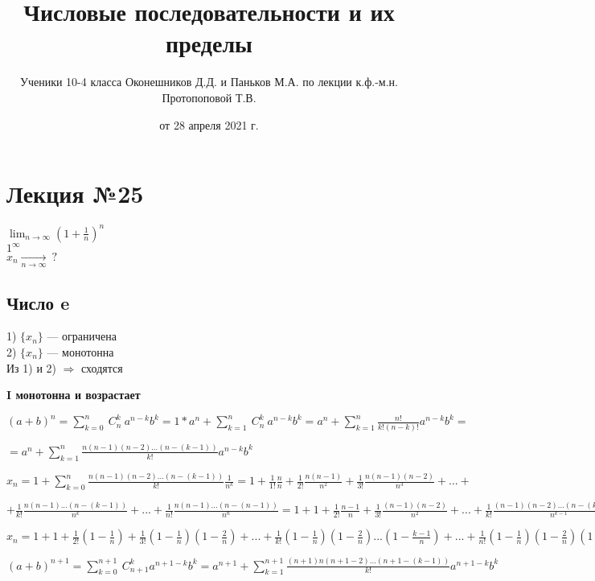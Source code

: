 \documentclass{article}
\begin{document}
\title{Числовые последовательности и их пределы}
\author{Ученики 10-4 класса Оконешников Д.Д. и Паньков М.А. по лекции к.ф.-м.н. Протопоповой Т.В.}
\date{от 28 апреля 2021 г.}
\maketitle

\section{Лекция №25}

\(\lim_{n \rightarrow \infty}{(1 + \frac{1}{n})^n}\)
\\ \(1^{\infty}\)
\\ \( x_n \xrightarrow[n \rightarrow \infty ]{}\ ? \)

\subsection{Число e}
1) \( \{ x_n \} \) --- ограничена \\
2) \( \{ x_n \} \) --- монотонна \\
Из 1) и 2) \( \Rightarrow \) сходятся

\textbf{I монотонна и возрастает}

\((a+b)^n = \sum_{k=0}^n\ C^k_n \ a^{n-k}b^k=1*a^n+\sum_{k=1}^n\ C^k_n \ a^{n-k}b^k = a^n+\sum_{k=1}^n \frac{n!}{k!(n-k)!} a^{n-k}b^k = \)

\( = a^n + \sum_{k=1}^n \frac{n(n-1)(n-2)...(n-(k-1))}{k!} a^{n-k} b^k\)

\( x_n = 1 + \sum_{k=0}^n \frac{n(n-1)(n-2)...(n-(k-1))}{k!} \frac{1}{n^k} = 1 + \frac{1}{1!} \frac{n}{n} + \frac{1}{2!} \frac{n(n-1)}{n^2} + \frac{1}{3!} \frac{n(n-1)(n-2)}{n^3} + ... + \)

\( + \frac{1}{k!} \frac{n(n-1)...(n-(k-1))}{n^k} + ... + \frac{1}{n!} \frac{n(n-1)...(n-(n-1))}{n^n} = 1 + 1 + \frac{1}{2!} \frac{n-1}{n} + \frac{1}{3!} \frac{(n-1)(n-2)}{n^2} + ... + \frac{1}{k!} \frac{(n-1)(n-2)...(n-(k-1))}{n^{k-1}} + ... +\)

\(x_n = 1+1+\frac{1}{2!}(1-\frac{1}{n})+\frac{1}{3!}(1-\frac{1}{n})(1-\frac{2}{n})+...+\frac{1}{k!}(1-\frac{1}{n})(1-\frac{2}{n})...(1-\frac{k-1}{n}) + ... + \frac{1}{n!} (1 - \frac{1}{n})(1 - \frac{2}{n})(1 - \frac{n-1}{n})\)

\((a+b)^{n+1} = \sum_{k=0}^{n+1}\ C_{n+1}^k a^{n+1-k} b^k = a^{n+1} + \sum_{k=1}^{n+1} \frac{(n+1)n(n+1-2)...(n+1-(k-1))}{k!} a^{n+1-k} b^k\)
\end{document}
